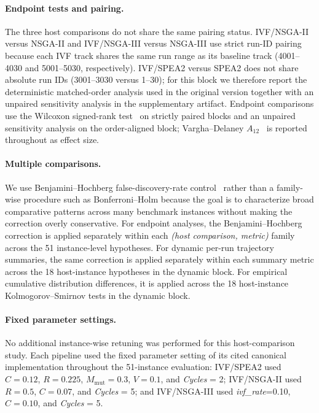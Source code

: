 \documentclass[runningheads]{llncs}
\begin{document}
\paragraph{Endpoint tests and pairing.}
The three host comparisons do not share the same pairing status. IVF/NSGA-II versus NSGA-II and IVF/NSGA-III versus NSGA-III use strict run-ID pairing because each IVF track shares the same run range as its baseline track (4001--4030 and 5001--5030, respectively). IVF/SPEA2 versus SPEA2 does not share absolute run IDs (3001--3030 versus 1--30); for this block we therefore report the deterministic matched-order analysis used in the original version together with an unpaired sensitivity analysis in the supplementary artifact. Endpoint comparisons use the Wilcoxon signed-rank test~\cite{wilcoxon1945} on strictly paired blocks and an unpaired sensitivity analysis on the order-aligned block; Vargha--Delaney $A_{12}$~\cite{vargha2000a12} is reported throughout as effect size.

\paragraph{Multiple comparisons.}
We use Benjamini--Hochberg false-discovery-rate control~\cite{benjamini1995bh} rather than a family-wise procedure such as Bonferroni--Holm because the goal is to characterize broad comparative patterns across many benchmark instances without making the correction overly conservative. For endpoint analyses, the Benjamini--Hochberg correction is applied separately within each \emph{(host comparison, metric)} family across the 51 instance-level hypotheses. For dynamic per-run trajectory summaries, the same correction is applied separately within each summary metric across the 18 host-instance hypotheses in the dynamic block. For empirical cumulative distribution differences, it is applied across the 18 host-instance Kolmogorov--Smirnov tests in the dynamic block.

\paragraph{Fixed parameter settings.}
No additional instance-wise retuning was performed for this host-comparison study. Each pipeline used the fixed parameter setting of its cited canonical implementation throughout the 51-instance evaluation: IVF/SPEA2 used $C=0.12$, $R=0.225$, $M_{\mathrm{mut}}=0.3$, $V=0.1$, and \textit{Cycles} = 2; IVF/NSGA-II used $R=0.5$, $C=0.07$, and \textit{Cycles} = 5; and IVF/NSGA-III used \textit{ivf\_rate}=0.10, $C=0.10$, and \textit{Cycles} = 5.
\end{document}
